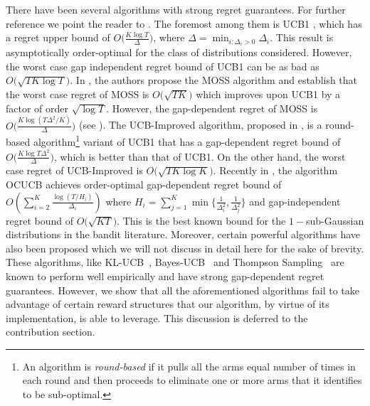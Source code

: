 	There have been several algorithms with strong regret guarantees. For further reference we point the reader to \citet{bubeck2012bandits}. The foremost among them is UCB1 \citep{auer2002finite}, which has a regret upper bound of $O\big(\frac{K\log T}{\Delta}\big)$, where $\Delta = \min_{i:\Delta_i>0} \Delta_i$. This result is asymptotically order-optimal for the class of distributions considered. However, the worst case gap independent regret bound of UCB1  can be as bad as $O \big(\sqrt{TK\log T}\big)$.  In \citet{audibert2009minimax}, the authors propose the MOSS algorithm and establish that the worst case regret of MOSS is $O\big(\sqrt{TK}\big)$ which improves upon UCB1 by a factor of order $\sqrt{\log T}$. However, the gap-dependent regret of MOSS is  $O\big(\frac{K\log\left(T\Delta^{2}/K\right)}{\Delta}\big)$   (see \citep{audibert2009minimax,lattimore2015optimally}). The UCB-Improved algorithm, proposed in \citet{auer2010ucb}, is a round-based algorithm\footnote{An algorithm is \textit{round-based} if it pulls all the arms equal number of times in each round and then proceeds to eliminate one or more arms that it identifies to be sub-optimal.} variant of UCB1 that 
has a gap-dependent regret bound of $O\big(\frac{K\log T\Delta^{2}}{\Delta}\big)$, which is better than that of UCB1. On the other hand, the worst case regret of UCB-Improved is $O\big(\sqrt{TK\log K}\big)$. Recently in \citet{lattimore2015optimally}, the algorithm OCUCB achieves order-optimal gap-dependent regret bound of $O\left(\sum_{i=2}^{K}\frac{\log\left(T/H_i\right)}{\Delta_i}\right)$ where $H_i=\sum_{j=1}^{K}\min\lbrace \frac{1}{\Delta_i^2},\frac{1}{\Delta_j^2}\rbrace$ and gap-independent regret bound of $O\big( \sqrt{KT}\big)$. This is the best known bound for the $1-$sub-Gaussian distributions in the bandit literature. Moreover, certain powerful algorithms have also been proposed which we will not discuss in detail here for the sake of brevity. These algorithms, like KL-UCB~\citep{garivier2011kl}, Bayes-UCB~\citep{kaufmann2012bayesian} and Thompson Sampling~\citep{thompson1933likelihood,agrawal2011analysis} are known to perform well empirically and have strong gap-dependent regret guarantees.  However, we show that all the aforementioned algorithms fail to take advantage of certain reward structures that our algorithm, by virtue of its implementation, is able to leverage. This discussion is deferred to the contribution section.

